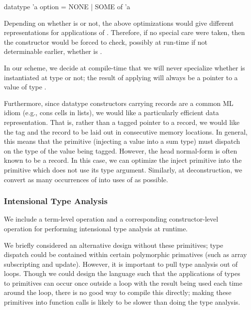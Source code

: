 \documentclass[12pt,twoside]{article}
\begin{document}
\begin{code}
datatype 'a option = NONE | SOME of 'a 
\end{code}

Depending on whether  is  or not, the above
optimizations would give different representations for applications of
.  Therefore, if no special care were taken, then the
constructor  would be forced to check, possibly at run-time if
not determinable earlier, whether  is .  

In our scheme, we decide at compile-time that we will never specialize
 whether  is instantiated at type  or not;
the result of applying  will always be a pointer to a 
value of type .
\smallskip

Furthermore, since datatype constructors carrying records are a common
ML idiom (e.g., cons cells in lists), we would like a particularly
efficient data representation.  That is, rather than a tagged pointer
to a record, we would like the tag and the record to be laid out in
consecutive memory locations.  In general, this means that the
 primitive (injecting a value into a sum type) must
dispatch on the type of the value being tagged.
However, the head normal-form is often known to be a record.  In this
case, we can optimize the inject primitive into the 
primitive which does not use its type argument.
Similarly, at deconstruction, we convert as many occurrences of
 into uses of  as possible.

\subsubsection{Intensional Type Analysis}

We include a  term-level operation and a corresponding
 constructor-level operation for performing intensional
type analysis at runtime.~\cite{harper-morrisett:intensional}

We briefly considered an alternative design without these primitives;
type dispatch could be contained within certain polymorphic primatives
(such as array subscripting and update).  However, it is important to
pull type analysis out of loops.  Though we could design the language
such that the applications of types to primitives can occur once
outside a loop with the result being used each time around the loop,
there is no good way to compile this directly; making these primitives
into function calls is likely to be slower than doing the type
analysis.
\end{document}
